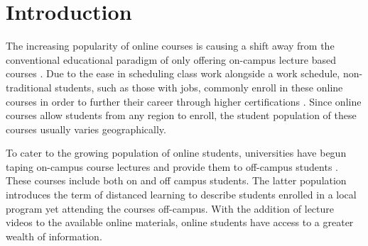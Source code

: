 \documentclass{sig-alternate}
\begin{document}









\section{Introduction}
The increasing popularity of online courses is causing a shift away
from the conventional educational paradigm of only offering on-campus
lecture based courses \cite{BELLER,DOE}.  Due to the ease in
scheduling class work alongside a work schedule, non-traditional
students, such as those with jobs, commonly enroll in these online
courses in order to further their career through higher certifications
\cite{BURGESS}.  Since online courses allow students from any region
to enroll, the student population of these courses usually varies
geographically.

To cater to the growing population of online students, universities
have begun taping on-campus course lectures and provide them to
off-campus students \cite{CVN,SCPD}.  These courses include both
on and off campus students.  The latter population introduces the term
of distanced learning to describe students enrolled in a local program
yet attending the courses off-campus.  With the addition of lecture
videos to the available online materials, online students have access
to a greater wealth of information.
\end{document}
